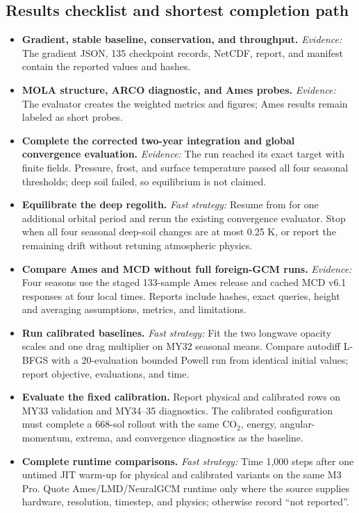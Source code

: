 \documentclass{article}
\newcommand{\done}{\(\boxtimes\)}
\newcommand{\todo}{\(\square\)}
\newcommand{\fast}{\textit{Fast strategy:}}
\newcommand{\evidence}{\textit{Evidence:}}
\begin{document}
\subsection{Results checklist and shortest completion path}
\begin{itemize}[leftmargin=1.8em,itemsep=5pt]
\item[\done] \textbf{Gradient, stable baseline, conservation, and throughput.}
\evidence{} The gradient JSON, 135 checkpoint records, NetCDF, report, and
manifest contain the reported values and hashes.

\item[\done] \textbf{MOLA structure, ARCO diagnostic, and Ames probes.}
\evidence{} The evaluator creates the weighted metrics and figures; Ames results
remain labeled as short probes.

\item[\done] \textbf{Complete the corrected two-year integration and global
convergence evaluation.} \evidence{} The run reached its exact target with
finite fields. Pressure, frost, and surface temperature passed all four seasonal
thresholds; deep soil failed, so equilibrium is not claimed.

\item[\todo] \textbf{Equilibrate the deep regolith.} \fast{} Resume from
for one additional orbital period and rerun the existing convergence evaluator.
Stop when all four seasonal deep-soil changes are at most 0.25 K, or report the
remaining drift without retuning atmospheric physics.

\item[\done] \textbf{Compare Ames and MCD without full foreign-GCM runs.}
\evidence{} Four seasons use the staged 133-sample Ames release and cached
MCD v6.1 responses at four local times. Reports include hashes, exact queries,
height and averaging assumptions, metrics, and limitations.

\item[\todo] \textbf{Run calibrated baselines.} \fast{} Fit the two longwave
opacity scales and one drag multiplier on MY32 seasonal means. Compare autodiff
L-BFGS with a 20-evaluation bounded Powell run from identical initial values;
report objective, evaluations, and time.

\item[\todo] \textbf{Evaluate the fixed calibration.} Report physical and
calibrated rows on MY33 validation and MY34--35 diagnostics. The calibrated
configuration must complete a 668-sol rollout with the same CO$_2$, energy,
angular-momentum, extrema, and convergence diagnostics as the baseline.

\item[\todo] \textbf{Complete runtime comparisons.} \fast{} Time 1,000 steps
after one untimed JIT warm-up for physical and calibrated variants on
the same M3 Pro. Quote Ames/LMD/NeuralGCM runtime only where the source supplies
hardware, resolution, timestep, and physics; otherwise record ``not reported''.
\end{itemize}
\end{document}
